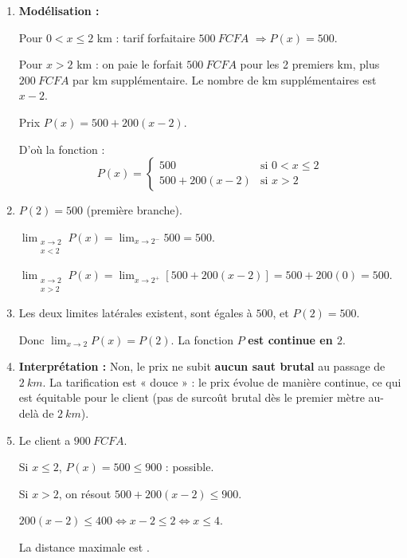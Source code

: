\documentclass[11pt]{article}
\begin{document}
\begin{corrige}
\begin{enumerate}
\item \textbf{Modélisation :} \par
Pour $0 < x \leq 2$ km : tarif forfaitaire $\SI{500}{FCFA}$ $\Rightarrow P(x) = 500$. \par
Pour $x > 2$ km : on paie le forfait $\SI{500}{FCFA}$ pour les 2 premiers km, plus $\SI{200}{FCFA}$ par km supplémentaire. Le nombre de km supplémentaires est $x-2$. \par
Prix $P(x) = 500 + 200(x-2)$. \par
D'où la fonction :
\[
P(x) = \begin{cases} 500 & \text{si } 0 < x \leq 2 \\ 500 + 200(x-2) & \text{si } x > 2 \end{cases}
\]
\item $P(2) = 500$ (première branche). \par
$\displaystyle\lim_{\substack{x \to 2 \\ x < 2}} P(x) = \lim_{x \to 2^-} 500 = \boxed{500}$. \par
$\displaystyle\lim_{\substack{x \to 2 \\ x > 2}} P(x) = \lim_{x \to 2^+} [500 + 200(x-2)] = 500 + 200(0) = \boxed{500}$.
\item Les deux limites latérales existent, sont égales à $500$, et $P(2)=500$. \par
Donc $\displaystyle\lim_{x \to 2} P(x) = P(2)$. La fonction $P$ \textbf{est continue en $2$}.
\item \textbf{Interprétation :} Non, le prix ne subit \textbf{aucun saut brutal} au passage de $\SI{2}{km}$. La tarification est « douce » : le prix évolue de manière continue, ce qui est équitable pour le client (pas de surcoût brutal dès le premier mètre au-delà de $\SI{2}{km}$).
\item Le client a $\SI{900}{FCFA}$. \par
Si $x \leq 2$, $P(x)=500 \leq 900$ : possible. \par
Si $x > 2$, on résout $500 + 200(x-2) \leq 900$. \par
$200(x-2) \leq 400 \iff x-2 \leq 2 \iff x \leq 4$. \par
La distance maximale est .
\end{enumerate}


\end{corrige}
\end{document}
